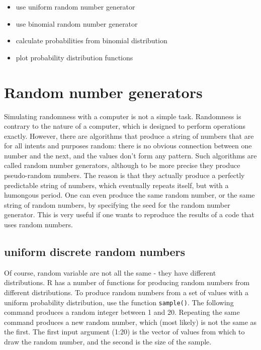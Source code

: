 \documentclass[
  letterpaper,
  DIV=11,
  numbers=noendperiod]{scrreprt}
\providecommand{\tightlist}{%
  \setlength{\itemsep}{0pt}\setlength{\parskip}{0pt}}\usepackage{longtable,booktabs,array}
\begin{document}
\begin{itemize}
\tightlist
\item
  use uniform random number generator
\item
  use binomial random number generator
\item
  calculate probabilities from binomial distribution
\item
  plot probability distribution functions
\end{itemize}

\hypertarget{random-number-generators}{%
\section*{Random number generators}\label{random-number-generators}}


Simulating randomness with a computer is not a simple task. Randomness
is contrary to the nature of a computer, which is designed to perform
operations exactly. However, there are algorithms that produce a string
of numbers that are for all intents and purposes random: there is no
obvious connection between one number and the next, and the values don't
form any pattern. Such algorithms are called random number generators,
although to be more precise they produce pseudo-random numbers. The
reason is that they actually produce a perfectly predictable string of
numbers, which eventually repeats itself, but with a humongous period.
One can even produce the same random number, or the same string of
random numbers, by specifying the seed for the random number generator.
This is very useful if one wants to reproduce the results of a code that
uses random numbers.

\hypertarget{uniform-discrete-random-numbers}{%
\subsection*{uniform discrete random
numbers}\label{uniform-discrete-random-numbers}}

Of course, random variable are not all the same - they have different
distributions. R has a number of functions for producing random numbers
from different distributions. To produce random numbers from a set of
values with a uniform probability distribution, use the function
\texttt{sample()}. The following command produces a random integer
between 1 and 20. Repeating the same command produces a new random
number, which (most likely) is not the same as the first. The first
input argument (1:20) is the vector of values from which to draw the
random number, and the second is the size of the sample.
\end{document}
